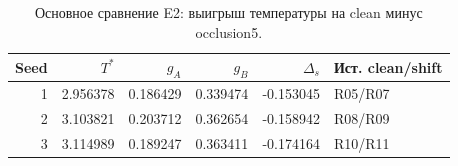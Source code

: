 \begin{table}[H]\centering\footnotesize
\setlength{\tabcolsep}{4pt}
\caption{Основное сравнение E2: выигрыш температуры на clean минус occlusion5.}\label{tab:pairs}
\begin{tabular}{rrrrrl}
\toprule
Seed & $T^*$ & $g_A$ & $g_B$ & $\Delta_s$ & Ист. clean/shift \\
\midrule
1 & 2.956378 & 0.186429 & 0.339474 & -0.153045 & R05/R07 \\
2 & 3.103821 & 0.203712 & 0.362654 & -0.158942 & R08/R09 \\
3 & 3.114989 & 0.189247 & 0.363411 & -0.174164 & R10/R11 \\
\bottomrule
\end{tabular}
\end{table}
